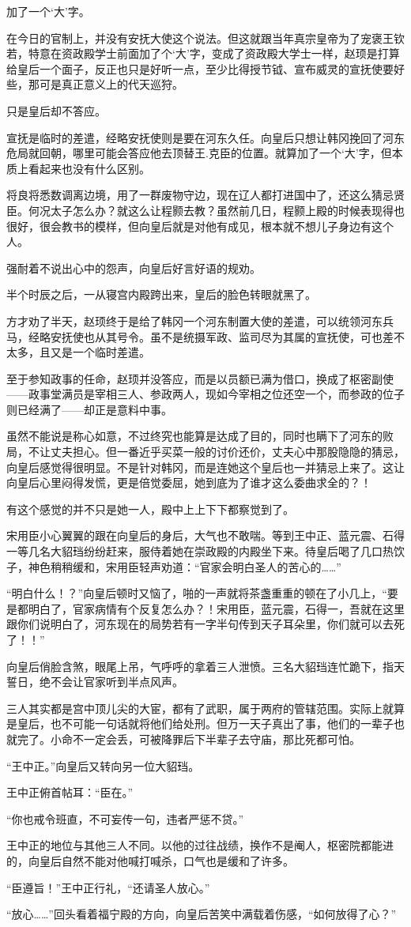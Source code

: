 加了一个‘大’字。

在今日的官制上，并没有安抚大使这个说法。但这就跟当年真宗皇帝为了宠褒王钦若，特意在资政殿学士前面加了个‘大’字，变成了资政殿大学士一样，赵顼是打算给皇后一个面子，反正也只是好听一点，至少比得授节钺、宣布威灵的宣抚使要好些，那可是真正意义上的代天巡狩。

只是皇后却不答应。

宣抚是临时的差遣，经略安抚使则是要在河东久任。向皇后只想让韩冈挽回了河东危局就回朝，哪里可能会答应他去顶替王.克臣的位置。就算加了一个‘大’字，但本质上看起来也没有什么区别。

将良将悉数调离边境，用了一群废物守边，现在辽人都打进国中了，还这么猜忌贤臣。何况太子怎么办？就这么让程颢去教？虽然前几日，程颢上殿的时候表现得也很好，很会教书的模样，但向皇后就是对他有成见，根本就不想儿子身边有这个人。

强耐着不说出心中的怨声，向皇后好言好语的规劝。

半个时辰之后，一从寝宫内殿跨出来，皇后的脸色转眼就黑了。

方才劝了半天，赵顼终于是给了韩冈一个河东制置大使的差遣，可以统领河东兵马，经略安抚使也从其号令。虽不是统摄军政、监司尽为其属的宣抚使，可也差不太多，且又是一个临时差遣。

至于参知政事的任命，赵顼并没答应，而是以员额已满为借口，换成了枢密副使——政事堂满员是宰相三人、参政两人，现如今宰相之位还空一个，而参政的位子则已经满了——却正是意料中事。

虽然不能说是称心如意，不过终究也能算是达成了目的，同时也瞒下了河东的败局，不让丈夫担心。但一番近乎买菜一般的讨价还价，丈夫心中那股隐隐的猜忌，向皇后感觉得很明显。不是针对韩冈，而是连她这个皇后也一并猜忌上来了。这让向皇后心里闷得发慌，更是倍觉委屈，她到底为了谁才这么委曲求全的？！

有这个感觉的并不只是她一人，殿中上上下下都察觉到了。

宋用臣小心翼翼的跟在向皇后的身后，大气也不敢喘。等到王中正、蓝元震、石得一等几名大貂珰纷纷赶来，服侍着她在崇政殿的内殿坐下来。待皇后喝了几口热饮子，神色稍稍缓和，宋用臣轻声劝道：“官家会明白圣人的苦心的……”

“明白什么！？”向皇后顿时又恼了，啪的一声就将茶盏重重的顿在了小几上，“要是都明白了，官家病情有个反复怎么办？！宋用臣，蓝元震，石得一，吾就在这里跟你们说明白了，河东现在的局势若有一字半句传到天子耳朵里，你们就可以去死了！！”

向皇后俏脸含煞，眼尾上吊，气呼呼的拿着三人泄愤。三名大貂珰连忙跪下，指天誓日，绝不会让官家听到半点风声。

三人其实都是宫中顶儿尖的大宦，都有了武职，属于两府的管辖范围。实际上就算是皇后，也不可能一句话就将他们给处刑。但万一天子真出了事，他们的一辈子也就完了。小命不一定会丢，可被降罪后下半辈子去守庙，那比死都可怕。

“王中正。”向皇后又转向另一位大貂珰。

王中正俯首帖耳：“臣在。”

“你也戒令班直，不可妄传一句，违者严惩不贷。”

王中正的地位与其他三人不同。以他的过往战绩，换作不是阉人，枢密院都能进的，向皇后自然不能对他喊打喊杀，口气也是缓和了许多。

“臣遵旨！”王中正行礼，“还请圣人放心。”

“放心……”回头看着福宁殿的方向，向皇后苦笑中满载着伤感，“如何放得了心？”
